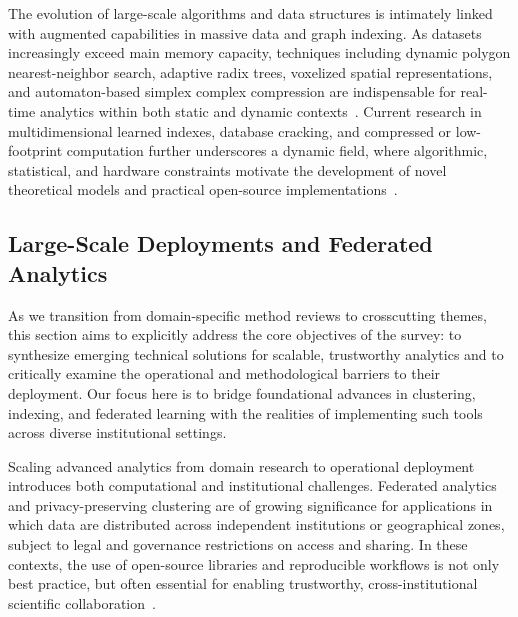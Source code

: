 \documentclass[sigconf]{acmart}
\begin{document}
The evolution of large-scale algorithms and data structures is intimately linked with augmented capabilities in massive data and graph indexing. As datasets increasingly exceed main memory capacity, techniques including dynamic polygon nearest-neighbor search, adaptive radix trees, voxelized spatial representations, and automaton-based simplex complex compression are indispensable for real-time analytics within both static and dynamic contexts~\cite{ref63,ref94,ref109,ref110}. Current research in multidimensional learned indexes, database cracking, and compressed or low-footprint computation further underscores a dynamic field, where algorithmic, statistical, and hardware constraints motivate the development of novel theoretical models and practical open-source implementations~\cite{ref97,ref98,ref107,ref108}.

\subsection{Large-Scale Deployments and Federated Analytics}

As we transition from domain-specific method reviews to crosscutting themes, this section aims to explicitly address the core objectives of the survey: to synthesize emerging technical solutions for scalable, trustworthy analytics and to critically examine the operational and methodological barriers to their deployment. Our focus here is to bridge foundational advances in clustering, indexing, and federated learning with the realities of implementing such tools across diverse institutional settings.

Scaling advanced analytics from domain research to operational deployment introduces both computational and institutional challenges. Federated analytics and privacy-preserving clustering are of growing significance for applications in which data are distributed across independent institutions or geographical zones, subject to legal and governance restrictions on access and sharing. In these contexts, the use of open-source libraries and reproducible workflows is not only best practice, but often essential for enabling trustworthy, cross-institutional scientific collaboration~\cite{ref116}.
\end{document}
